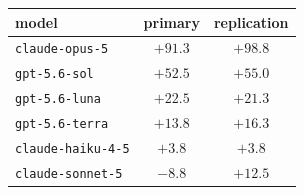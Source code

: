 \begin{tabular}{lcc}
\toprule
model & primary & replication \\
\midrule
\texttt{claude-opus-5} & $+91.3$ & $+98.8$ \\
\texttt{gpt-5.6-sol} & $+52.5$ & $+55.0$ \\
\texttt{gpt-5.6-luna} & $+22.5$ & $+21.3$ \\
\texttt{gpt-5.6-terra} & $+13.8$ & $+16.3$ \\
\texttt{claude-haiku-4-5} & $+3.8$ & $+3.8$ \\
\texttt{claude-sonnet-5} & $-8.8$ & $+12.5$ \\
\bottomrule
\end{tabular}
